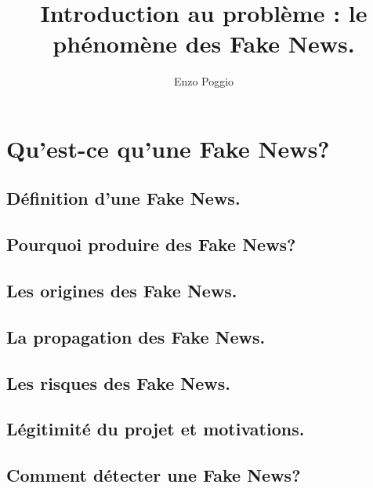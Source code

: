 \documentclass[onecolumn, 12pt]{article}
\title{Introduction au problème : le phénomène des Fake News.}
\author{Enzo Poggio}
\begin{document}
\maketitle{}

\section{Qu'est-ce qu'une Fake News?}
\subsection{Définition d'une Fake News.}


\subsection{Pourquoi produire des Fake News?}


\subsection{Les origines des Fake News.}


\subsection{La propagation des Fake News.}


\subsection{Les risques des Fake News.}

\subsection{Légitimité du projet et motivations.}


\subsection{Comment détecter une Fake News?}

\end{document}
